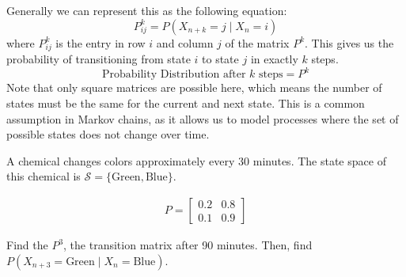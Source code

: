 Generally we can represent this as the following equation:
\[
    P^k_{ij} = P(X_{n+k}=j \mid X_n=i)
\]
where $P^k_{ij}$ is the entry in row $i$ and column $j$ of the matrix $P^k$. This gives us the probability of transitioning from state $i$ to state $j$ in exactly $k$ steps.
\[
    \text{Probability Distribution after $k$ steps} = P^{k}
\]
Note that only square matrices are possible here, which means the number of states must be the same for the current and next state. This is a common assumption in Markov chains, as it allows us to model processes where the set of possible states does not change over time.
\begin{Exercise}[title={Chemical Change}, label={ex:markov_3}]
    A chemical changes colors approximately every 30 minutes. The state space of this chemical is $\mathcal{S} = \{\text{Green}, \text{Blue}\}$.

    $$\begin{array}{c} P=
            \begin{bmatrix}
                0.2 & 0.8 \\
                0.1 & 0.9
            \end{bmatrix}\end{array}$$

    Find the $P^3$, the transition matrix after 90 minutes. Then, find $P(X_{n+3}=\text{Green} \mid X_n=\text{Blue})$.
\end{Exercise}
